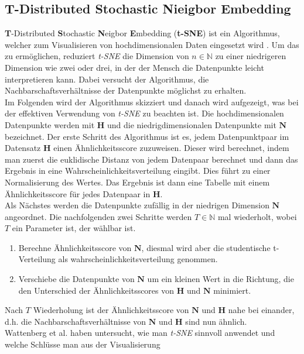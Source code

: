 \documentclass[12pt,letterpaper,ngerman]{article}
\begin{document}
\subsection{ T-Distributed Stochastic Nieigbor Embedding}
{\bf T}-Distributed {\bf S}tochastic {\bf N}eigbor {\bf E}mbedding
({\bf  t-SNE}) ist ein Algorithmus, welcher zum Visualisieren von
hochdimensionalen Daten eingesetzt wird
\cite{JMLR:v9:vandermaaten08a}. Um das zu ermöglichen,
reduziert  \textit{t-SNE} die Dimension von $n \in \mathbb{N}$ zu
einer niedrigeren Dimension wie zwei oder drei, in der der 
Mensch die Datenpunkte leicht interpretieren kann. Dabei versucht
der Algorithmus, die Nachbarschaftsverhältnisse der Datenpunkte
möglichst zu erhalten.\\
Im Folgenden wird der Algorithmus skizziert und danach wird aufgezeigt,
was bei der effektiven Verwendung von \textit{t-SNE} zu beachten ist. Die
hochdimensionalen Datenpunkte werden mit $\mathbf{H}$ und die 
niedrigdimensionalen Datenpunkte mit $\mathbf{N}$ bezeichnet. Der erste Schritt 
des Algorithmus ist es, jedem Datenpunktpaar im Datensatz $\mathbf{H}$
einen Ähnlichkeitsscore zuzuweisen. Dieser wird berechnet, indem man 
zuerst die euklidische Distanz von jedem Datenpaar berechnet und dann das 
Ergebnis in eine Wahrscheinlichkeitsverteilung eingibt. Dies führt zu
einer Normalisierung des Wertes. Das Ergebnis ist dann eine Tabelle mit 
einem Ähnlichkeitsscore für jedes Datenpaar in $\mathbf{H}$.\\
Als Nächstes werden die Datenpunkte zufällig in der niedrigen Dimension 
$\mathbf{N}$ angeordnet. Die nachfolgenden zwei Schritte werden 
$T\in \mathbb{N}$ 
mal wiederholt, wobei $T$ ein Parameter ist, der wählbar ist.
\begin{enumerate}
  \item Berechne Ähnlichkeitsscore von $\mathbf{N}$, diesmal wird aber die
      studentische t-Verteilung als wahrscheinlichkeitsverteilung genommen. 
  \item Verschiebe die Datenpunkte von $\mathbf{N}$ um ein kleinen Wert in
    die Richtung, die den Unterschied der Ähnlichkeitsscores von $\mathbf{H}$
    und $\mathbf{N}$ minimiert.
\end{enumerate}
Nach $T$ Wiederholung ist der Ähnlichkeitsscore von $\mathbf{N}$ und 
$\mathbf{H}$ nahe bei einander, d.h. die Nachbarschaftsverhältnisse 
von $\mathbf{N}$ und $\mathbf{H}$ sind nun ähnlich.\\
Wattenberg et al. haben untersucht, wie man  \textit{t-SNE} sinnvoll
anwendet und welche Schlüsse man aus der Visualisierung 
\end{document}
